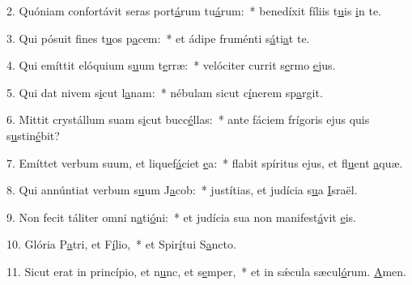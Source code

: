 2. Quóniam confortávit seras port\uline{á}rum tu\uline{á}rum:~* benedíxit fíliis t\uline{u}is \uline{i}n te.\par 
3. Qui pósuit fines t\uline{u}os p\uline{a}cem:~* et ádipe fruménti s\uline{á}ti\uline{a}t te.\par 
4. Qui emíttit elóquium s\uline{u}um t\uline{e}rræ:~* velóciter currit s\uline{e}rmo \uline{e}jus.\par 
5. Qui dat nivem s\uline{i}cut l\uline{a}nam:~* nébulam sicut c\uline{í}nerem sp\uline{a}rgit.\par 
6. Mittit crystállum suam s\uline{i}cut bucc\uline{é}llas:~* ante fáciem frígoris ejus quis s\uline{u}stin\uline{é}bit?\par 
7. Emíttet verbum suum, et liquef\uline{á}ciet \uline{e}a:~* flabit spíritus ejus, et fl\uline{u}ent \uline{a}quæ.\par 
8. Qui annúntiat verbum s\uline{u}um J\uline{a}cob:~* justítias, et judícia s\uline{u}a \uline{I}sraël.\par 
9. Non fecit táliter omni n\uline{a}ti\uline{ó}ni:~* et judícia sua non manifest\uline{á}vit \uline{e}is.\par 
10. Glória P\uline{a}tri, et F\uline{í}lio,~* et Spir\uline{í}tui S\uline{a}ncto.\par 
11. Sicut erat in princípio, et n\uline{u}nc, et s\uline{e}mper,~* et in sǽcula sæcul\uline{ó}rum. \uline{A}men.\par 
